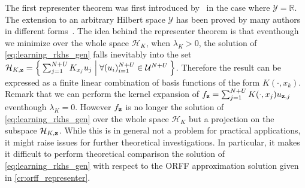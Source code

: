 The first representer theorem was first introduced by~\citet{Wahba90} in the case where $\mathcal{Y}=\mathbb{R}$. The extension to an arbitrary Hilbert space $\mathcal{Y}$ has been proved by many authors in different forms~\citep{Brouard2011,kadri2015operator,Micchelli2005}. The idea behind the representer theorem is that eventhough we minimize over the whole space $\mathcal{H}_K$, when $\lambda_K>0$, the solution of \cref{eq:learning_rkhs_gen} falls inevitably into the set $\mathcal{H}_{K, \boldsymbol{\mathbf{z}}}=\Set{\sum_{j=1}^{N+U}K_{x_j}u_j| \forall (u_i)_{i=1}^{N+U} \in\mathcal{U}^{N+U}}$. Therefore the result can be expressed as a finite linear combination of basis functions of the form $K(\cdot,x_k)$. Remark that we can perform the kernel expansion of $f_{\boldsymbol{\mathbf{z}}}=\sum_{j=1}^{N+U}K(\cdot,x_j)u_{\boldsymbol{\mathbf{z}},j}$ eventhough $\lambda_K=0$. However $f_{\boldsymbol{\mathbf{z}}}$ is no longer the solution of \cref{eq:learning_rkhs_gen} over the whole space $\mathcal{H}_K$ but a projection on the subspace $\mathcal{H}_{K, \boldsymbol{\mathbf{z}}}$. While this is in general not a problem for practical applications, it might raise issues for further theoretical investigations. In particular, it makes it difficult to perform theoretical comparison the  solution of \cref{eq:learning_rkhs_gen} with respect to the \acs{ORFF} approximation solution given in \cref{cr:orff_representer}.
